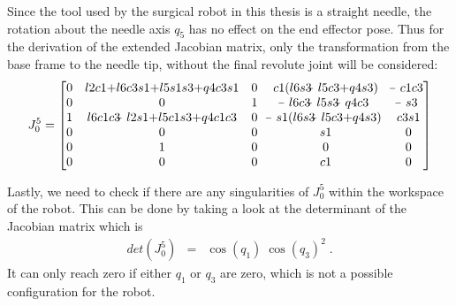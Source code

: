 Since the tool used by the surgical robot in this thesis is a straight needle, the rotation about the needle axis $q_5$ has no effect on the end effector pose. Thus for the derivation of the extended Jacobian matrix, only the transformation from the base frame to the needle tip, without the final revolute joint will be considered:
\begin{eqnarray}\label{J_5}
J_0^5 =	\begin{bmatrix}	
		0 & l2c1\matplus l6c3s1\matplus l5s1s3\matplus q4c3s1 & 0 & c1(l6s3\matminus l5c3\matplus q4s3) & \matminus c1c3\\
		0 & 0 & 1 & \matminus l6c3\matminus l5s3\matminus q4c3 & \matminus s3\\
		1 & l6c1c3\matminus l2s1\matplus l5c1s3\matplus q4c1c3 & 0 & \matminus s1(l6s3\matminus l5c3\matplus q4s3) & c3s1\\
		0 & 0 & 0 & s1 & 0\\
		0 & 1 & 0 & 0 & 0\\
		0 & 0 & 0 & c1 & 0\\
		\end{bmatrix}
\end{eqnarray}

Lastly, we need to check if there are any singularities of $J^5_0$ within the workspace of the robot. This can be done by taking a look at the determinant of the Jacobian matrix which is 
\begin{eqnarray}\label{det_J_5}
	det(J^5_0) &=& \cos(q_1)\;\cos(q_3)^2\; .
\end{eqnarray}
It can only reach zero if either $q_1$ or $q_3$ are zero, which is not a possible configuration for the robot.

